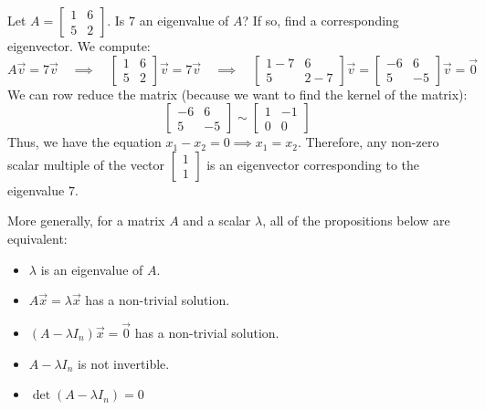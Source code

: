 \begin{eg}
    Let $A = \begin{bmatrix}
        1 & 6 \\ 5 & 2
    \end{bmatrix}$. Is $7$ an eigenvalue of $A$? If so, find a corresponding eigenvector. We compute:
    \[A \vec{v} = 7 \vec{v} \quad \implies \quad \begin{bmatrix}
        1 & 6 \\ 5 & 2
    \end{bmatrix} \vec{v} = 7 \vec{v} \quad \implies \quad \begin{bmatrix}
        1 - 7 & 6 \\ 5 & 2 - 7
    \end{bmatrix} \vec{v} = \begin{bmatrix}
        -6 & 6 \\ 5 & -5
    \end{bmatrix} \vec{v} = \vec{0}\]
    We can row reduce the matrix (because we want to find the kernel of the matrix):
    \[\begin{bmatrix}
        -6 & 6 \\ 5 & -5
    \end{bmatrix} \sim \begin{bmatrix}
        1 & -1 \\ 0 & 0
    \end{bmatrix}\]
    Thus, we have the equation $x_1 - x_2 = 0 \implies x_1 = x_2$. Therefore, any non-zero scalar multiple of the vector $\begin{bmatrix}
        1 \\ 1
    \end{bmatrix}$ is an eigenvector corresponding to the eigenvalue $7$.
\end{eg}
More generally, for a matrix $A$ and a scalar $\lambda$, all of the propositions below are equivalent:
\begin{itemize}[itemsep=1pt,label=$\circ$]
    \item $\lambda$ is an eigenvalue of $A$.
    \item $A \vec{x} = \lambda \vec{x}$ has a non-trivial solution.
    \item $(A - \lambda I_n) \vec{x} = \vec{0}$ has a non-trivial solution.
    \item $A - \lambda I_n$ is not invertible.
    \item $\det(A - \lambda I_n) = 0$
\end{itemize}

